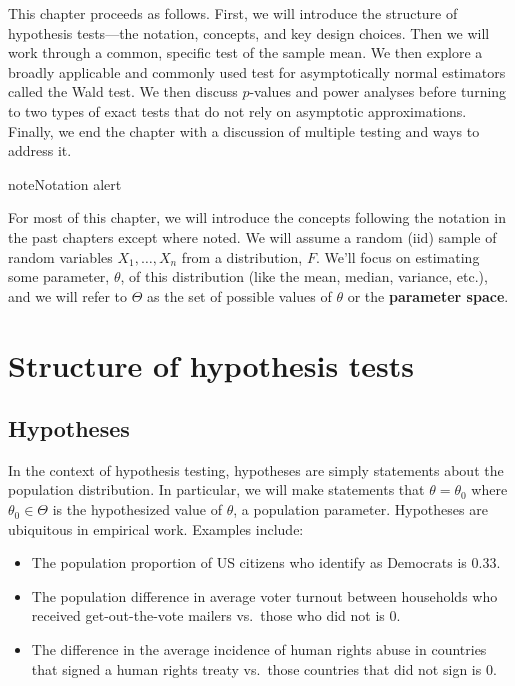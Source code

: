 \documentclass[
  13pt,
  letterpaper,
  DIV=11,
  numbers=noendperiod]{scrreprt}
\providecommand{\tightlist}{%
  \setlength{\itemsep}{0pt}\setlength{\parskip}{0pt}}
\theoremstyle{plain}
\theoremstyle{plain}
\theoremstyle{definition}
\theoremstyle{definition}
\theoremstyle{remark}
\begin{document}
This chapter proceeds as follows. First, we will introduce the structure
of hypothesis tests---the notation, concepts, and key design choices.
Then we will work through a common, specific test of the sample mean. We
then explore a broadly applicable and commonly used test for
asymptotically normal estimators called the Wald test. We then discuss
\(p\)-values and power analyses before turning to two types of exact
tests that do not rely on asymptotic approximations. Finally, we end the
chapter with a discussion of multiple testing and ways to address it.

\begin{bookcallout}{note}{Notation alert}

For most of this chapter, we will introduce the concepts following the
notation in the past chapters except where noted. We will assume a
random (iid) sample of random variables \(X_1, \ldots, X_n\) from a
distribution, \(F\). We'll focus on estimating some parameter,
\(\theta\), of this distribution (like the mean, median, variance,
etc.), and we will refer to \(\Theta\) as the set of possible values of
\(\theta\) or the \textbf{parameter space}.

\end{bookcallout}

\section{Structure of hypothesis
tests}\label{structure-of-hypothesis-tests}

\subsection{Hypotheses}\label{sec-hypotheses}

In the context of hypothesis testing, hypotheses are simply statements
about the population distribution. In particular, we will make
statements that \(\theta = \theta_0\) where \(\theta_0 \in \Theta\) is
the hypothesized value of \(\theta\), a population parameter. Hypotheses
are ubiquitous in empirical work. Examples include:

\begin{itemize}
\tightlist
\item
  The population proportion of US citizens who identify as Democrats is
  0.33.
\item
  The population difference in average voter turnout between households
  who received get-out-the-vote mailers vs.~those who did not is 0.
\item
  The difference in the average incidence of human rights abuse in
  countries that signed a human rights treaty vs.~those countries that
  did not sign is 0.
\end{itemize}
\end{document}
